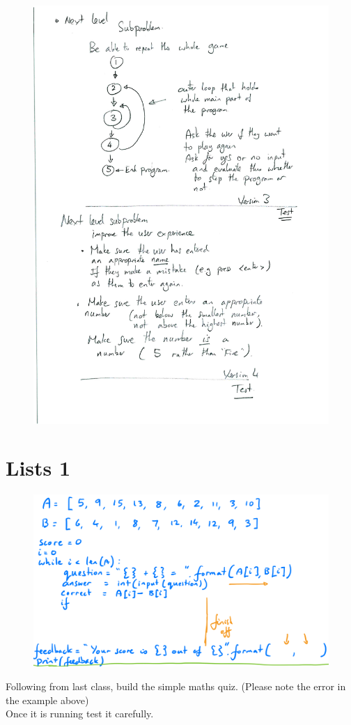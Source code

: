 \documentclass[a4paper,12pt]{article}
\begin{document}
\newpage
\begin{figure} [!h]
	\centering
	\includegraphics[width=17cm]{iterative_processes/higherlowerplanning-2.pdf}
\end{figure}



\newpage
\section{Lists 1}
\begin{figure} [!h]
	\centering
	\includegraphics[width=17cm]{iterative_processes/lists_maths_game.png}
\end{figure}
Following from last class, build the simple maths quiz. (Please note the error in the example above)\\
Once it is running test it carefully.\\
\end{document}
